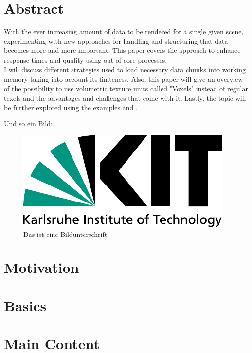 
\chapter{Abstract}
\label{ch:Abstract}

With the ever increasing amount of data to be rendered for a single given scene, experimenting with new approaches for handling and structuring that data becomes more and more important. This paper covers the approach to enhance response times and quality using out of core processes. \\
I will discuss different strategies used to load necessary data chunks into working memory taking into account its finiteness. Also, this paper will give an overview of the possibility to use volumetric texture units called "Voxels" instead of regular texels and the advantages and challenges that come with it. Lastly, the topic will be further explored using the examples \cite{Crassin:2009:GRS:1507149.1507152} and \cite{van2009id}.
%

%
Und so ein Bild:\\
\begin{figure}[h]
  \begin{center}
    \includegraphics[width=.3\textwidth]{logos/KITLogo_RGB.pdf}
    \caption{Das ist eine Bildunterschrift}
  \end{center}
\end{figure}

\chapter{Motivation}
\label{ch:Motivation}

\chapter{Basics}
\label{ch:Basics}


\chapter{Main Content}
\label{ch:MainContent}

